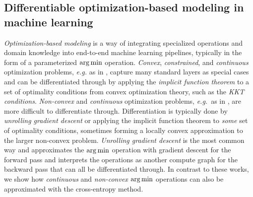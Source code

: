 \documentclass{article}
\newcommand{\eg}{{\it e.g.}\xspace}
\begin{document}
\subsection{Differentiable optimization-based modeling in machine learning}
\emph{Optimization-based modeling} is a way of integrating specialized
operations and domain knowledge into end-to-end machine learning pipelines,
typically in the form of a parameterized $\operatorname*{arg\,min}$ operation.
\emph{Convex}, \emph{constrained}, and \emph{continuous} optimization problems,
\eg as in
\citet{gould2016differentiating,johnson2016composing,amos2017input,amos2017optnet,agrawal2019differentiable},
capture many standard layers as special cases and
can be differentiated through by applying the \emph{implicit function theorem}
to a set of optimality conditions from convex optimization theory,
such as the \emph{KKT conditions}.
\emph{Non-convex} and \emph{continuous} optimization problems,
\emph{e.g.}\ as in
\citet{domke2012generic,belanger2016structured,metz2016unrolled,finn2017model,belanger2017end,rusu2018meta,srinivas2018universal,foerster2018learning,amos2018differentiable,pedregosa2016hyperparameter,jenni2018deep,rajeswaran2019meta,zhang2019deep},
are more difficult to differentiate through.
Differentiation is typically done by \emph{unrolling gradient descent}
or applying the implicit function theorem to \emph{some}
set of optimality conditions, sometimes forming a locally
convex approximation to the larger non-convex problem.
\emph{Unrolling gradient descent} is the most common way and approximates
the $\operatorname*{arg\,min}$ operation with gradient descent for the forward pass and
interprets the operations as another compute graph for the backward pass
that can all be differentiated through.
In contrast to these works, we show how \emph{continuous} and
\emph{non-convex} $\operatorname*{arg\,min}$ operations can also be approximated with
the cross-entropy method.
\end{document}
